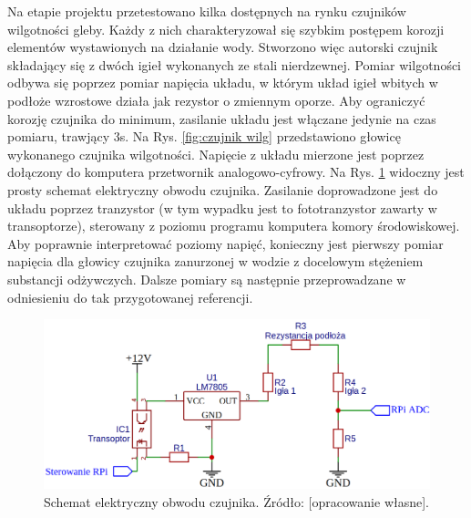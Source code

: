Na etapie projektu przetestowano kilka dostępnych na rynku czujników wilgotności gleby. Każdy z nich charakteryzował się szybkim postępem korozji elementów wystawionych na działanie wody. Stworzono więc autorski czujnik składający się z dwóch igieł wykonanych ze stali nierdzewnej. Pomiar wilgotności odbywa się poprzez pomiar napięcia układu, w którym układ igieł wbitych w podłoże wzrostowe działa jak rezystor o zmiennym oporze. Aby ograniczyć korozję czujnika do minimum, zasilanie układu jest włączane jedynie na czas pomiaru, trawjący 3s. Na Rys. \ref{fig:czujnik wilg} przedstawiono głowicę wykonanego czujnika wilgotności. Napięcie z układu mierzone jest poprzez dołączony do komputera przetwornik analogowo-cyfrowy. Na Rys. \ref{fig:czujnik wilg sch} widoczny jest prosty schemat elektryczny obwodu czujnika. Zasilanie doprowadzone jest do układu poprzez tranzystor (w tym wypadku jest to fototranzystor zawarty w transoptorze), sterowany z poziomu programu komputera komory środowiskowej. Aby poprawnie interpretować poziomy napięć, konieczny jest pierwszy pomiar napięcia dla głowicy czujnika zanurzonej w wodzie z docelowym stężeniem substancji odżywczych. Dalsze pomiary są następnie przeprowadzane w odniesieniu do tak przygotowanej referencji.

\begin{figure}[h]
	\centering
	\includegraphics[scale=.4]{schemat_wilg}
	\caption{Schemat elektryczny obwodu czujnika. Źródło: [opracowanie własne].} 
	\label{fig:czujnik wilg sch}
\end{figure}

